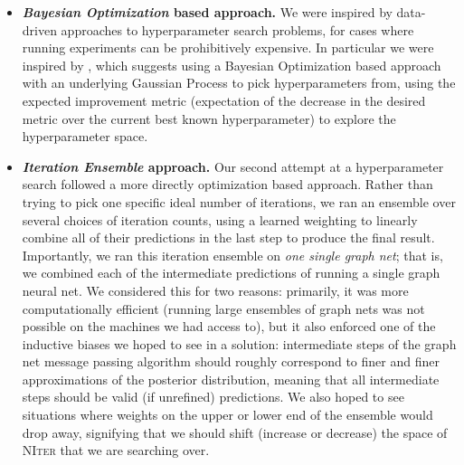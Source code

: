 \begin{itemize}
\item \textbf{\emph{Bayesian Optimization} based approach.}
  We were inspired by data-driven approaches to hyperparameter search problems, for cases where running experiments can be prohibitively expensive.
  In particular we were inspired by \cite{snoek2012practical}, which suggests using a Bayesian Optimization based approach with an underlying Gaussian Process to pick hyperparameters from, using the expected improvement metric (expectation of the decrease in the desired metric over the current best known hyperparameter) to explore the hyperparameter space.
\item \textbf{\emph{Iteration Ensemble} approach.}
  Our second attempt at a hyperparameter search followed a more directly optimization based approach.
  Rather than trying to pick one specific ideal number of iterations, we ran an ensemble over several choices of iteration counts, using a learned weighting to linearly combine all of their predictions in the last step to produce the final result.
  Importantly, we ran this iteration ensemble on \emph{one single graph net}; that is, we combined each of the intermediate predictions of running a single graph neural net.
  We considered this for two reasons: primarily, it was more computationally efficient (running large ensembles of graph nets was not possible on the machines we had access to), but it also enforced one of the inductive biases we hoped to see in a solution: intermediate steps of the graph net message passing algorithm should roughly correspond to finer and finer approximations of the posterior distribution, meaning that all intermediate steps should be valid (if unrefined) predictions.
  We also hoped to see situations where weights on the upper or lower end of the ensemble would drop away, signifying that we should shift (increase or decrease) the space of \textsc{NIter} that we are searching over.
\end{itemize}